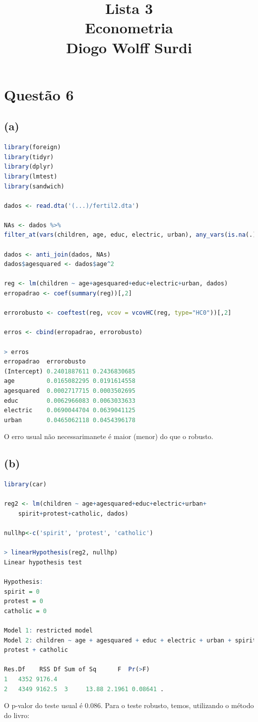 \documentclass[12pt]{article}
\title{Lista 3\\
Econometria\\
Diogo Wolff Surdi}
\begin{document}
\maketitle

\section*{Questão 6}

\subsection*{(a)}
\begin{lstlisting}[language=R]
library(foreign)
library(tidyr)
library(dplyr)
library(lmtest)
library(sandwich)

dados <- read.dta('(...)/fertil2.dta')

NAs <- dados %>%
filter_at(vars(children, age, educ, electric, urban), any_vars(is.na(.)))

dados <- anti_join(dados, NAs)
dados$agesquared <- dados$age^2

reg <- lm(children ~ age+agesquared+educ+electric+urban, dados)
erropadrao <- coef(summary(reg))[,2]

errorobusto <- coeftest(reg, vcov = vcovHC(reg, type="HC0"))[,2]

erros <- cbind(erropadrao, errorobusto)

> erros
erropadrao  errorobusto
(Intercept) 0.2401887611 0.2436830685
age         0.0165082295 0.0191614558
agesquared  0.0002717715 0.0003502695
educ        0.0062966083 0.0063033633
electric    0.0690044704 0.0639041125
urban       0.0465062118 0.0454396178
\end{lstlisting}
O erro usual não necessarimanete é maior (menor) do que o robusto.

\subsection*{(b)}
\begin{lstlisting}[language=R]
library(car)

reg2 <- lm(children ~ age+agesquared+educ+electric+urban+
	spirit+protest+catholic, dados)

nullhp<-c('spirit', 'protest', 'catholic')

> linearHypothesis(reg2, nullhp)
Linear hypothesis test

Hypothesis:
spirit = 0
protest = 0
catholic = 0

Model 1: restricted model
Model 2: children ~ age + agesquared + educ + electric + urban + spirit + 
protest + catholic

Res.Df    RSS Df Sum of Sq      F  Pr(>F)  
1   4352 9176.4                              
2   4349 9162.5  3     13.88 2.1961 0.08641 .
\end{lstlisting}
O p-valor do teste usual é 0.086. Para o teste robusto, temos, utilizando o método do livro:
\end{document}
